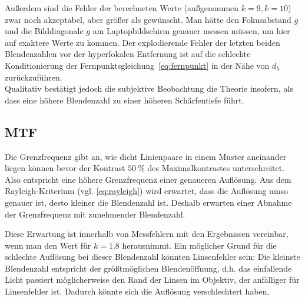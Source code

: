 Außerdem sind die Fehler der berechneten Werte (außgenommen $k=9, k=10$) zwar noch akzeptabel, aber größer als gewünscht. Man hätte den Fokusabstand $g$ und die Bilddiagonale $g$ am Laptopbildschirm genauer messen müssen, um hier auf exaktere Werte zu kommen. Der explodierende Fehler der letzten beiden Blendenzahlen vor der hyperfokalen Entfernung ist auf die schlechte Konditionierung der Fernpunktsgleichung~\cref{eq:fernpunkt} in der Nähe von $d_h$ zurückzuführen.\\

Qualitativ bestätigt jedoch die subjektive Beobachtung die Theorie insofern, als dass eine höhere Blendenzahl zu einer höheren Schärfentiefe führt.

\subsection{MTF}
Die Grenzfrequenz gibt an, wie dicht Linienpaare in einem Muster aneinander liegen können bevor der Kontrast $\SI{50}{\percent}$ des Maximalkontrastes unterschreitet. Also entspricht eine höhere Grenzfrequenz einer genaueren Auflösung. Aus dem Rayleigh-Kriterium (vgl. \cref{eq:rayleigh}) wird erwartet, dass die Auflösung umso genauer ist, desto kleiner die Blendenzahl ist. Deshalb erwarten einer Abnahme der Grenzfrequenz mit zunehmender Blendenzahl.

Diese Erwartung ist innerhalb von Messfehlern mit den Ergebnissen vereinbar, wenn man den Wert für $k=1.8$ herausnimmt. Ein möglicher Grund für die schlechte Auflösung bei dieser Blendenzahl könnten Linsenfehler sein: Die kleinste Blendenzahl entspricht der größtmöglichen Blendenöffnung, d.h. das einfallende Licht passiert möglicherweise den Rand der Linsen im Objektiv, der anfälliger für Linsenfehler ist. Dadurch könnte sich die Auflösung verschlechtert haben.
